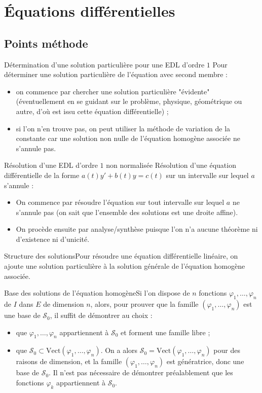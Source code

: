 \documentclass[french]{book}
\theoremstyle{plain}
\theoremstyle{definition}
\theoremstyle{remark}
\begin{document}
\chapter{Équations différentielles}
\localtableofcontents
\section{Points méthode}
\begin{PM}{Détermination d'une solution particulière pour une EDL d'ordre $1$} Pour déterminer une solution particulière de l'équation avec second membre :
\begin{itemize}
	\item on commence par chercher une solution particulière "évidente" (éventuellement en se guidant sur le problème, physique, géométrique ou autre, d'où est issu cette équation différentielle) ;
	\item si l'on n'en trouve pas, on peut utiliser la méthode de variation de la constante car une solution non nulle de l'équation homogène associée ne s'annule pas.
\end{itemize}
\end{PM}
\begin{PM}{Résolution d'une EDL d'ordre $1$ non normalisée} Résolution d'une équation différentielle de la forme $a(t)y'+b(t)y=c(t)$ sur un intervalle sur lequel $a$ s'annule :
\begin{itemize}
	\item On commence par résoudre l'équation sur tout intervalle sur lequel $a$ ne s'annule pas (on sait que l'ensemble des solutions est une droite affine).
	\item On procède ensuite par analyse/synthèse puisque l'on n'a aucune théorème ni d'existence ni d'unicité.
\end{itemize}
\end{PM}
\begin{PM}{Structure des solutions}Pour résoudre une équation différentielle linéaire, on ajoute une solution particulière à la solution générale de l'équation homogène associée.
\end{PM}
\begin{PM}{Base des solutions de l'équation homogène}Si l'on dispose de $n$ fonctions $\varphi_1,\ldots,\varphi_n$ de $I$ dans $E$ de dimension $n$, alors, pour prouver que la famille $(\varphi_1,\ldots,\varphi_n)$ est une base de $\mathcal{S}_0$, il suffit de démontrer au choix :
\begin{itemize}
	\item que $\varphi_1,\ldots,\varphi_n$ appartiennent à $\mathcal{S}_0$ et forment une famille libre ;
	\item que $\mathcal{S}_0\subset\text{Vect}(\varphi_1,\ldots,\varphi_n)$. On a alors $\mathcal{S}_0=\text{Vect}(\varphi_1,\ldots,\varphi_n)$ pour des raisons de dimension, et la famille $(\varphi_1,\ldots,\varphi_n)$ est génératrice, donc une base de $\mathcal{S}_0$. Il n'est pas nécessaire de démontrer préalablement que les fonctions $\varphi_k$ appartiennent à $\mathcal{S}_0$.
\end{itemize}
\end{PM}
\end{document}

